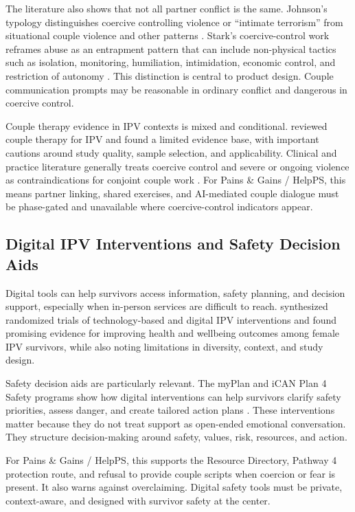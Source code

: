 \documentclass[11pt]{article}
\begin{document}
The literature also shows that not all partner conflict is the same. Johnson's typology distinguishes coercive controlling violence or ``intimate terrorism'' from situational couple violence and other patterns \citep{johnson2008}. Stark's coercive-control work reframes abuse as an entrapment pattern that can include non-physical tactics such as isolation, monitoring, humiliation, intimidation, economic control, and restriction of autonomy \citep{stark2007}. This distinction is central to product design. Couple communication prompts may be reasonable in ordinary conflict and dangerous in coercive control.

Couple therapy evidence in IPV contexts is mixed and conditional. \citet{karakurt2016} reviewed couple therapy for IPV and found a limited evidence base, with important cautions around study quality, sample selection, and applicability. Clinical and practice literature generally treats coercive control and severe or ongoing violence as contraindications for conjoint couple work \citep{hurless2018}. For Pains \& Gains / HelpPS, this means partner linking, shared exercises, and AI-mediated couple dialogue must be phase-gated and unavailable where coercive-control indicators appear.

\subsection{Digital IPV Interventions and Safety Decision Aids}

Digital tools can help survivors access information, safety planning, and decision support, especially when in-person services are difficult to reach. \citet{emezue2022} synthesized randomized trials of technology-based and digital IPV interventions and found promising evidence for improving health and wellbeing outcomes among female IPV survivors, while also noting limitations in diversity, context, and study design.

Safety decision aids are particularly relevant. The myPlan and iCAN Plan 4 Safety programs show how digital interventions can help survivors clarify safety priorities, assess danger, and create tailored action plans \citep{glass2010,fordgilboe2017,fordgilboe2020}. These interventions matter because they do not treat support as open-ended emotional conversation. They structure decision-making around safety, values, risk, resources, and action.

For Pains \& Gains / HelpPS, this supports the Resource Directory, Pathway 4 protection route, and refusal to provide couple scripts when coercion or fear is present. It also warns against overclaiming. Digital safety tools must be private, context-aware, and designed with survivor safety at the center.
\end{document}
